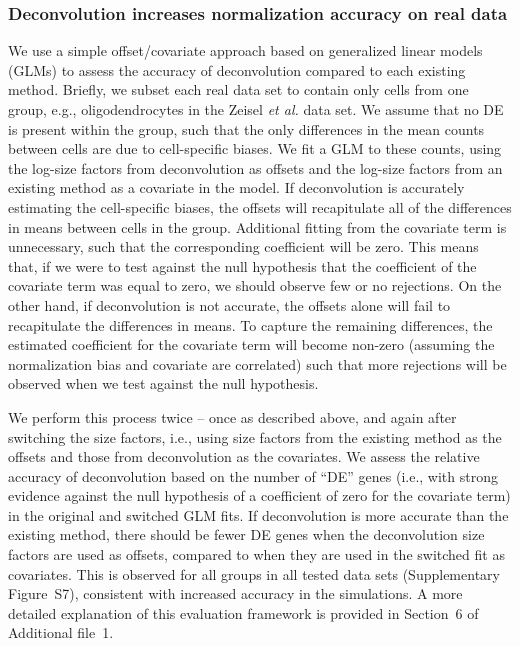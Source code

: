 \documentclass{bmcart}
\newcommand{\supprealassess}{6}
\newcommand{\suppdeassess}{S7}
\newcommand{\revised}[1]{#1}
\begin{document}
\revised{\subsubsection*{Deconvolution increases normalization accuracy on real data}
We use a simple offset/covariate approach based on generalized linear models (GLMs) to assess the accuracy of deconvolution compared to each existing method.
Briefly, we subset each real data set to contain only cells from one group, e.g., oligodendrocytes in the Zeisel \emph{et al.} data set.
We assume that no DE is present within the group, such that the only differences in the mean counts between cells are due to cell-specific biases.
We fit a GLM to these counts, using the log-size factors from deconvolution as offsets and the log-size factors from an existing method as a covariate in the model.
If deconvolution is accurately estimating the cell-specific biases, the offsets will recapitulate all of the differences in means between cells in the group.
Additional fitting from the covariate term is unnecessary, such that the corresponding coefficient will be zero.
This means that, if we were to test against the null hypothesis that the coefficient of the covariate term was equal to zero, we should observe few or no rejections.
On the other hand, if deconvolution is not accurate, the offsets alone will fail to recapitulate the differences in means.
To capture the remaining differences, the estimated coefficient for the covariate term will become non-zero (assuming the normalization bias and covariate are correlated) such that more rejections will be observed when we test against the null hypothesis.}

\revised{We perform this process twice -- once as described above, and again after switching the size factors, i.e., using size factors from the existing method as the offsets and those from deconvolution as the covariates. 
We assess the relative accuracy of deconvolution based on the number of ``DE'' genes (i.e., with strong evidence against the null hypothesis of a coefficient of zero for the covariate term) in the original and switched GLM fits.
If deconvolution is more accurate than the existing method, there should be fewer DE genes when the deconvolution size factors are used as offsets, compared to when they are used in the switched fit as covariates.
This is observed for all groups in all tested data sets (Supplementary Figure~\suppdeassess{}), consistent with increased accuracy in the simulations.
A more detailed explanation of this evaluation framework is provided in Section~\supprealassess{} of Additional file~1.
}
\end{document}
